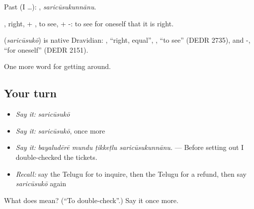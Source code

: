 Past (I …): , \emph{saricūsukunnānu}.

, right, + , to see, + -: to see for oneself that it is right.

\begin{cousinweb}
\textbf{} (\emph{saricūsukō}) is native Dravidian: , \textquotedblleft{}right, equal\textquotedblright{}, , \textquotedblleft{}to see\textquotedblright{} (DEDR 2735), and -, \textquotedblleft{}for oneself\textquotedblright{} (DEDR 2151).
\end{cousinweb}

\begin{grammarlens}[title={What you've built}]
One more word for getting around.
\end{grammarlens}

\subsection*{Your turn}
\begin{itemize}
\raggedright
  \item \emph{Say it:} \emph{saricūsukō}
  \item \emph{Say it:} \emph{saricūsukō}, once more
  \item \emph{Say it:} \emph{bayaludērē mundu ṭikkeṭlu saricūsukunnānu.} — Before setting out I double-checked the tickets.
  \item \emph{Recall:} say the Telugu for to inquire, then the Telugu for a refund, then say \emph{saricūsukō} again
\end{itemize}

\begin{tcolorbox}[breakable,colback=teal!4,colframe=teal!35!black,title={Before you move on}]
What does  mean? (\textquotedblleft{}To double-check\textquotedblright{}.) Say it once more.
\end{tcolorbox}
